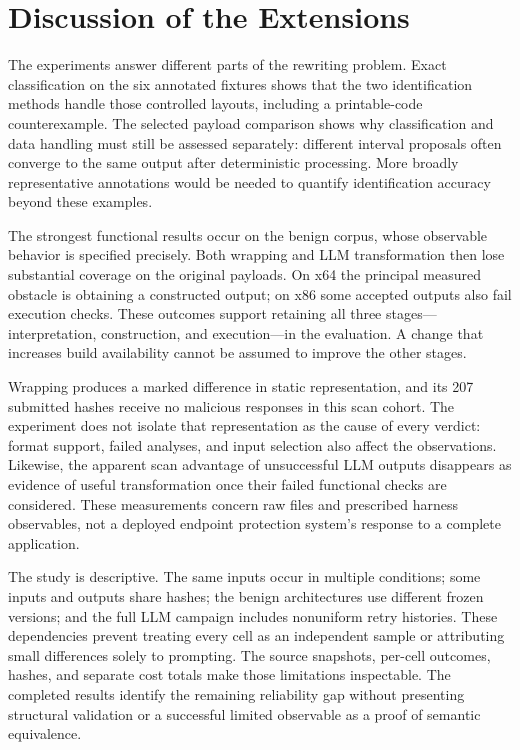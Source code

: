 \section{Discussion of the Extensions}\label{sec:extension_limits}
The experiments answer different parts of the rewriting problem. Exact
classification on the six annotated fixtures shows that the two
identification methods handle those controlled layouts, including a
printable-code counterexample. The selected payload comparison shows why
classification and data handling must still be assessed separately:
different interval proposals often converge to the same output after
deterministic processing. More broadly representative annotations would
be needed to quantify identification accuracy beyond these examples.

The strongest functional results occur on the benign corpus, whose
observable behavior is specified precisely. Both wrapping and LLM
transformation then lose substantial coverage on the original payloads.
On x64 the principal measured obstacle is obtaining a constructed output;
on x86 some accepted outputs also fail execution checks. These outcomes
support retaining all three stages---interpretation, construction, and
execution---in the evaluation. A change that increases build availability
cannot be assumed to improve the other stages.

Wrapping produces a marked difference in static representation, and its
207 submitted hashes receive no malicious responses in this scan cohort.
The experiment does not isolate that representation as the cause of every
verdict: format support, failed analyses, and input selection also affect
the observations. Likewise, the apparent scan advantage of unsuccessful
LLM outputs disappears as evidence of useful transformation once their
failed functional checks are considered. These measurements concern raw
files and prescribed harness observables, not a deployed endpoint
protection system's response to a complete application.

The study is descriptive. The same inputs occur in multiple conditions;
some inputs and outputs share hashes; the benign architectures use
different frozen versions; and the full LLM campaign includes nonuniform
retry histories. These dependencies prevent treating every cell as an
independent sample or attributing small differences solely to prompting.
The source snapshots, per-cell outcomes, hashes, and separate cost totals
make those limitations inspectable. The completed results identify the
remaining reliability gap without presenting structural validation or a
successful limited observable as a proof of semantic equivalence.
